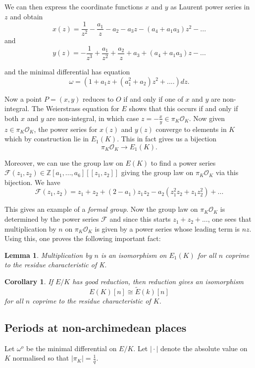 \documentclass[12pt]{amsart}
\numberwithin{equation}{section}
\newtheorem{lemma}[equation]{Lemma}
\newtheorem{cor}[equation]{Corollary}
\theoremstyle{remark}
\theoremstyle{definition}
\theoremstyle{definition}
\theoremstyle{definition}
\theoremstyle{definition}
\theoremstyle{definition}
\theoremstyle{definition}
\theoremstyle{definition}
\begin{document}
We can then express the coordinate functions $x$ and $y$ as Laurent power series in $z$ and obtain
\[x(z)=\frac{1}{z^2}-\frac{a_1}{z}-a_2-a_3z-(a_4+a_1a_3)z^2-...\]
and
\[y(z)=-\frac{1}{z^3}+\frac{a_1}{z^2}+\frac{a_2}{z}+a_3+(a_4+a_1a_3)z-...\]

and the minimal differential has equation
\[\omega=(1+a_1z+(a_1^2+a_2)z^2+....)dz.\]

Now a point $P=(x,y)$ reduces to $O$ if and only if one of $x$ and $y$ are non-integral. The Weierstrass equation for $E$ shows that this occurs if and only if both $x$ and $y$ are non-integral, in which case $z=-\frac{x}{y}\in \pi_K\mathcal{O}_K$. Now given $z\in \pi_K\mathcal{O}_K$, the power series for $x(z)$ and $y(z)$ converge to elements in $K$ which by construction lie in $E_1(K)$. This in fact gives us a bijection
\[\pi_K\mathcal{O}_K\rightarrow E_1(K).\]

Moreover, we can use the group law on $E(K)$ to find a power series $\mathcal{F}(z_1,z_2)\in \mathbb{Z}[a_1,...,a_6][[z_1,z_2]]$ giving the group law on  $\pi_K\mathcal{O}_K$ via this bijection. We have
\[\mathcal{F}(z_1,z_2)=z_1+z_2+(2-a_1)z_1z_2-a_2(z_1^2z_2+z_1z_2^2)+...\]

This gives an example of a \textit{formal group}. Now the group law on $\pi_K\mathcal{O}_K$ is determined by the power series $\mathcal{F}$ and since this starts $z_1+z_2+...$, one sees that multiplication by $n$ on $\pi_K\mathcal{O}_K$ is  given by a power series whose leading term is $nz$. Using this, one proves the following important fact:

\begin{lemma}
Multiplication by $n$ is an isomorphism on $E_1(K)$ for all $n$ coprime to the residue characteristic of K.
\end{lemma}

\begin{cor}
If $E/K$ has good reduction, then reduction gives an isomorphism 
\[E(K)[n]\cong \tilde{E}(k)[n]\]
for all $n$ coprime to the residue characteristic of $K$.
\end{cor}

\subsection{Periods at non-archimedean places}

Let $\omega^o$ be the minimal differential on $E/K$. Let $\mid \cdot \mid$ denote the absolute value on $K$ normalised so that $|\pi_K|=\frac{1}{q}$. 
\end{document}
